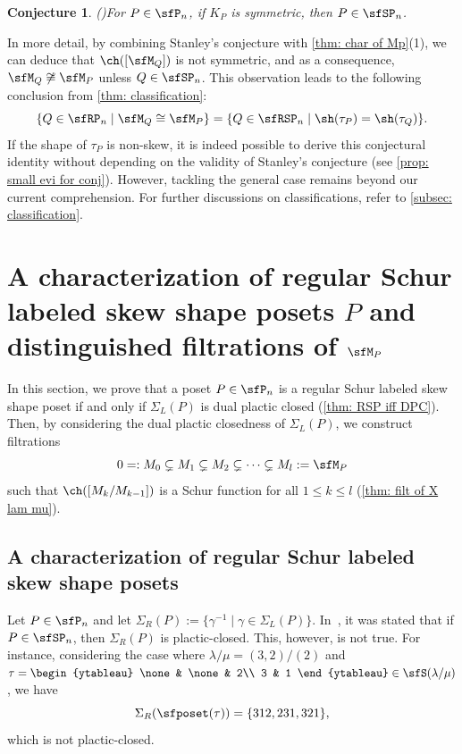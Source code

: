 \documentclass[12pt, reqno]{amsart}
\newtheorem{conjecture}[theorem]{Conjecture}
\theoremstyle{definition}
\numberwithin{equation}{section} \numberwithin{figure}{section}
\numberwithin{table}{section}
\begin{document}
\begin{conjecture}{\rm (\cite[p. 81]{72Stanley})}\label{conj: Stanley}
For $P \in \sfP_n$, if $K_P$ is symmetric, then $P \in \sfSP_n$.
\end{conjecture}


In more detail, by combining Stanley's conjecture with \cref{thm: char of Mp}(1), we can deduce that $\ch([\sfM_Q])$ is not symmetric, and as a consequence, $\sfM_Q \not\cong \sfM_P$ unless $Q \in \sfSP_n$. This observation leads to the following conclusion from \cref{thm: classification}:
\[
\{Q \in \sfRP_n \mid \sfM_Q \cong \sfM_P\} 
= 
\{Q \in \sfRSP_n \mid \sh(\tau_P) = \sh(\tau_Q) \}.
\]
If the shape of $\tau_P$ is non-skew, it is indeed possible to derive this conjectural identity without depending on the validity of Stanley's conjecture (see \cref{prop: small evi for conj}). 
However, tackling the general case remains beyond our current comprehension.
For further discussions on classifications, refer to \cref{subsec: classification}.











\section{A characterization of regular Schur labeled skew shape posets $P$ and distinguished filtrations of $\sfM_P$}\label{Sec: filtration}


In this section, we prove that a poset $P \in \sfP_n$ is a regular Schur labeled skew shape poset if and only if $\Sigma_L(P)$ is dual plactic closed (\cref{thm: RSP iff DPC}).
Then, by considering the dual plactic closedness of $\Sigma_L(P)$, we construct   filtrations 
\[
0 =: M_0  \subsetneq M_1 \subsetneq M_2 \subsetneq \cdots \subsetneq M_l := \sfM_P
\]
such that $\ch([M_{k}/M_{k-1}])$ is a Schur function for all $1 \leq k \leq l$
(\cref{thm: filt of X lam mu}). 





\subsection{A characterization of regular Schur labeled skew shape posets}\label{subsec: char of RSPn}


Let $P \in \sfP_n$ and let  $\Sigma_R(P) :=\{\gamma^{-1} \mid \gamma \in \Sigma_L(P)\}$.
In~\cite[Fact 1]{93M}, it was stated that if $P \in \sfSP_n$, then  $\Sigma_R(P)$ is plactic-closed. 
This, however, is not true.
For instance, considering the case where $\lambda/\mu = (3,2)/(2)$ and $\tau = \begin{ytableau}
\none & \none & 2\\
3 & 1
\end{ytableau} \in \sfS(\lambda/\mu)$,
we have
\[
\Sigma_R(\sfposet(\tau)) = \{312, 231, 321\}, 
\]
which is not plactic-closed.
\end{document}
